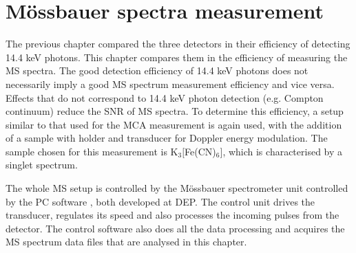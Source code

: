 \chapter{Mössbauer spectra measurement}
The previous chapter compared the three detectors in their efficiency of detecting 14.4 keV photons. This chapter compares them in the efficiency of measuring the MS spectra. The good detection efficiency of 14.4 keV photons does not necessarily imply a good MS spectrum measurement efficiency and vice versa. Effects that do not correspond to 14.4 keV photon detection (e.g. Compton continuum) reduce the SNR of MS spectra. To determine this efficiency, a setup similar to that used for the MCA measurement is again used, with the addition of a sample with holder and transducer for Doppler energy modulation. The sample chosen for this measurement is K$_{3}[$Fe(CN)$_{6}]$, which is characterised by a singlet spectrum.
\par
The whole MS setup is controlled by the Mössbauer spectrometer unit controlled by the PC software \cite{STEJSKAL2019thesis}, both developed at DEP. The control unit drives the transducer, regulates its speed and also processes the incoming pulses from the detector. The control software also does all the data processing and acquires the MS spectrum data files that are analysed in this chapter.

